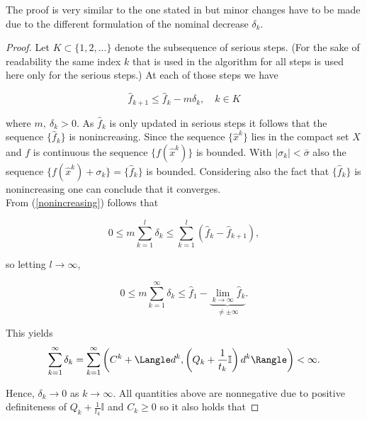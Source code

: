 The proof is very similar to the one stated in \cite{Hare2016} but minor changes have to be made due to the different formulation of the nominal decrease \(\delta_k\).

\begin{proof}
	Let \(K \subset \{1,2,...\}\) denote the subsequence of serious steps. (For the sake of readability the same index \(k\) that is used in the algorithm for all steps is used here only for the serious steps.)
	At each of those steps we have
	
	\begin{equation}
		\hat{f}_{k+1} \leq \hat{f}_k - m\delta_{k}, \quad {k} \in {K} 
	\label{nonincreasing}
	\end{equation}
	
	where \(m, ~\delta_{k} > 0\). 
	As \(\hat{f}_k\) is only updated in serious steps it follows that the sequence \(\{\hat{f}_k\}\) is nonincreasing.
	Since the sequence \(\{\hat{x}^k\}\) lies in the compact set \(X\) and \(f\) is continuous the sequence \(\{f(\hat{x}^k)\}\) is bounded. %
	With \(|\sigma_k| < \bar{\sigma}\) also the sequence \(\{f(\hat{x}^k)+\sigma_k\} = \{\hat{f}_k\}\) is bounded. Considering also the fact that \(\{\hat{f}_k\}\) is nonincreasing one can conclude that it converges. \\
	From (\ref{nonincreasing}) follows that
	
	\begin{equation*}
		0 \leq m \sum_{k = 1}^l \delta_k \leq \sum_{k = 1}^l \left(\hat{f}_k-\hat{f}_{k+1}\right),
	\end{equation*}
	
	so letting \(l \to \infty\), 
	
	\begin{equation*}
		0 \leq m\sum_{k=1}^{\infty} \delta_k \leq \hat{f}_1 - \underbrace{\lim_{k \to \infty} \hat{f}_k}_{\neq \pm \infty}.
	\end{equation*}
	
	This yields
	\begin{equation*}
		\sum_{k = 1}^{\infty} \delta_k = \sum_{k=1}^{\infty}\left(C^k+\Langle d^k,\left(Q_k+\frac{1}{t_k}\mathbb{I}\right)d^k\Rangle \right) < \infty.
	\end{equation*}
	
	Hence, \(\delta_k \to 0\) as \(k \to \infty\). All quantities above are nonnegative due to positive definiteness of \(Q_k+\frac{1}{t_k}\mathbb{I}\) and \(C_k \geq 0\) so it also holds that
	

\end{proof}
